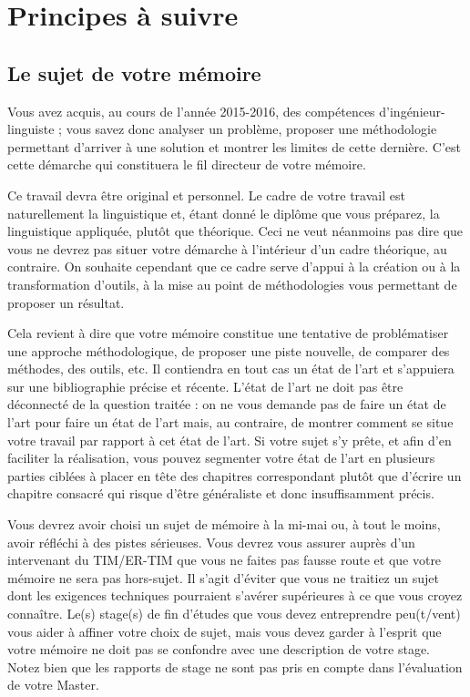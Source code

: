 \documentclass{report}
\begin{document}
\chapter{Principes à suivre}

\section{Le sujet de votre mémoire}
Vous avez acquis, au cours de l'année 2015-2016, des compétences d'ingénieur-linguiste ; vous savez donc analyser un problème, proposer une méthodologie permettant d'arriver à une solution et montrer les limites de cette dernière. C'est cette démarche qui constituera le fil directeur de votre mémoire.

Ce travail devra être original et personnel. Le cadre de votre travail est naturellement la linguistique et, étant donné le diplôme que vous préparez, la linguistique appliquée, plutôt que théorique. Ceci ne veut néanmoins pas dire que vous ne devrez pas situer votre démarche à l'intérieur d'un cadre théorique, au contraire. On souhaite cependant que ce cadre serve d'appui à la création ou à la transformation d'outils, à la mise au point de méthodologies vous permettant de proposer un résultat.

Cela revient à dire que votre mémoire constitue une tentative de problématiser une approche méthodologique, de proposer une piste nouvelle, de comparer des méthodes, des outils, etc. Il contiendra en tout cas un état de l'art et s'appuiera sur une bibliographie précise et récente. L'état de l'art ne doit pas être déconnecté de la question traitée : on ne vous demande pas de faire un état de l'art pour faire un état de l'art mais, au contraire, de montrer comment se situe votre travail par rapport à cet état de l'art.
Si votre sujet s'y prête, et afin d'en faciliter la réalisation, vous pouvez segmenter votre état de l'art en plusieurs parties ciblées à placer en tête des chapitres correspondant plutôt que d'écrire un chapitre consacré qui risque d'être généraliste et donc insuffisamment précis.

Vous devrez avoir choisi un sujet de mémoire à la mi-mai ou, à tout le moins, avoir réfléchi à des pistes sérieuses. Vous devrez vous assurer auprès d'un intervenant du TIM/ER-TIM que vous ne faites pas fausse route et que votre mémoire ne sera pas hors-sujet. Il s'agit d'éviter que vous ne traitiez un sujet dont les exigences techniques pourraient s'avérer supérieures à ce que vous croyez connaître. Le(s) stage(s) de fin d'études que vous devez entreprendre peu(t/vent) vous aider à affiner votre choix de sujet, mais vous devez garder à l'esprit que votre mémoire ne doit pas se confondre avec une description de votre stage. Notez bien que les rapports de stage ne sont pas pris en compte dans l'évaluation de votre Master.
\end{document}
